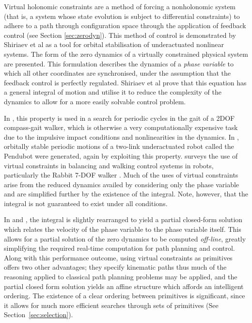 Virtual holonomic constraints are a method of forcing a nonholonomic system (that is, a system whose state evolution is subject to differential constraints) to adhere to a path through configuration space through the application of feedback control (see Section \ref{sec:zerodyn}). This method of control is demonstrated by Shiriaev et al \cite{shiriaev2005constructive} as a tool for orbital stabilisation of underactuated nonlinear systems. The form of the zero dynamics of a virtually constrained physical system are presented. This formulation describes the dynamics of a \textit{phase variable} to which all other coordinates are synchronised, under the assumption that the feedback control is perfectly regulated. Shiriaev et al prove that this equation has a general integral of motion and utilise it to reduce the complexity of the dynamics to allow for a more easily solvable control problem. 

In \cite{freidovich2009passive}, this property is used in a search for periodic cycles in the gait of a 2DOF compass-gait walker, which is otherwise a very computationally expensive task due to the impulsive impact conditions and nonlinearities in the dynamics. In \cite{freidovich2008periodic}, orbitally stable periodic motions of a two-link underactuated robot called the Pendubot were generated, again by exploiting this property. \cite{canudas2004concept} surveys the use of virtual constraints in balancing and walking control systems in robots, particularly the Rabbit 7-DOF walker \cite{chevallereau2003rabbit}. Much of the uses of virtual constraints arise from the reduced dynamics availed by considering only the phase variable and are simplified further by the existence of the integral. Note, however, that the integral is not guaranteed to exist under all conditions.

In \cite{manchester2011stable} and \cite{manchester13planning}, the integral is slightly rearranged to yield a partial closed-form solution which relates the velocity of the phase variable to the phase variable itself. This allows for a partial solution of the zero dynamics to be computed \textit{off-line}, greatly simplifying the required real-time computation for path planning and control. Along with this performance outcome, using virtual constraints as primitives offers two other advantages; they specify kinematic paths thus much of the reasoning applied to classical path planning problems may be applied, and the partial closed form solution yields an affine structure which affords an intelligent ordering. The existence of a clear ordering between primitives is significant, since it allows for much more efficient searches through sets of primitives (See Section~\ref{sec:selection}).

